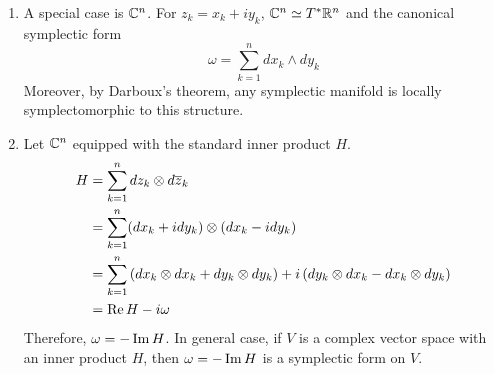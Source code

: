 \documentclass[a4paper,12pt]{article}
\begin{document}
	\begin{rem}
		\begin{enumerate}
			\item A special case is $\mathbb{C}^n$. For $z_k = x_k +iy_k$, $\mathbb{C}^n \simeq T^*\mathbb{R}^n$ and the canonical symplectic form 
			\begin{equation*}
				\omega = \sum_{k=1}^n dx_k \wedge dy_k
			\end{equation*}
			Moreover, by Darboux's theorem, any symplectic manifold is locally symplectomorphic to this structure.
			\item Let $\mathbb{C}^n$ equipped with the standard inner product $H$.
			\begin{equation*}
				\begin{split}
					H&= \sum_{k=1}^ndz_k \otimes d\overline{z}_k \\
					&= \sum_{k=1}^n (dx_k +idy_k) \otimes (dx_k -idy_k) \\
					&= \sum_{k=1}^n \left(dx_k \otimes dx_k+ dy_k \otimes dy_k\right) + i \left(dy_k \otimes dx_k - dx_k \otimes dy_k\right) \\
					&=\operatorname{Re} H - i \omega
				\end{split}
			\end{equation*}
			Therefore, $\omega = -\operatorname{Im} H$. In general case, if $V$ is a complex vector space with an inner product $H$, then $\omega = -\operatorname{Im} H$ is a symplectic form on $V$. 
		\end{enumerate}
	\end{rem}
\end{document}
